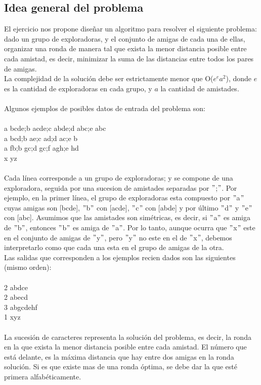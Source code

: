 \subsection{Idea general del problema}
El ejercicio nos propone diseñar un algoritmo para resolver el siguiente problema: dado un grupo de exploradoras, y el conjunto 
de amigas de cada una de ellas, organizar una ronda de manera tal que exista la menor distancia posible entre cada amistad, es 
decir, minimizar la suma de las distancias entre todos los pares de amigas. \\
La complejidad de la solución debe ser estrictamente menor que O($e^ea^2$), donde $e$ es la cantidad de exploradoras en cada grupo, y $a$ la cantidad de amistades. \\
\\
Algunos ejemplos de posibles datos de entrada del problema son: \\
\\
a bcde;b acde;c abde;d abc;e abc \\
a bcd;b ae;c ad;d ac;e b \\
a fb;b gc;d gc;f agh;e hd \\
x yz \\
\\
Cada línea corresponde a un grupo de exploradoras; y se compone de una exploradora, seguida por una sucesion de amistades
separadas por $"$;$"$. Por ejemplo, en la primer línea, el grupo de exploradoras esta compuesto por $"$a$"$ cuyas amigas son [bcde],
$"$b$"$ con [acde], $"$c$"$ con [abde] y por último $"$d$"$ y $"$e$"$ con  [abc]. Asumimos que las amistades son simétricas, es decir, si $"$a$"$ es
amiga de $"$b$"$, entonces $"$b$"$ es amiga de $"$a$"$. Por lo tanto, aunque ocurra que $"$x$"$ este en el conjunto de amigas de $"$y$"$, pero $"$y$"$ no este en el de $"$x$"$, debemos interpretarlo como que cada una esta en el grupo de amigas de la otra.   
\\
Las salidas que corresponden a los ejemplos recien dados son las siguientes (mismo orden): \\
\\
2 abdce \\
2 abecd \\
3 abgcdehf \\
1 xyz \\
\\
La sucesión de caracteres representa la solución del problema, es decir, la ronda en la que exista la menor distancia posible entre cada amistad. El número que está delante, es la máxima distancia que hay entre dos amigas en la ronda solución. Si es que existe mas de una ronda óptima, se debe dar la que esté primera alfabéticamente. 

